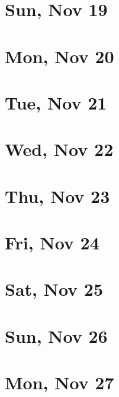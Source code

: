 	\section{Sun, Nov 19}
		
		
	\section{Mon, Nov 20}
		
		
	\section{Tue, Nov 21}
		
		
	\section{Wed, Nov 22}
		
		
	\section{Thu, Nov 23}
		
		
	\section{Fri, Nov 24}
		
		
	\section{Sat, Nov 25}
		
		
	\section{Sun, Nov 26}
		
		
	\section{Mon, Nov 27}
		
		
